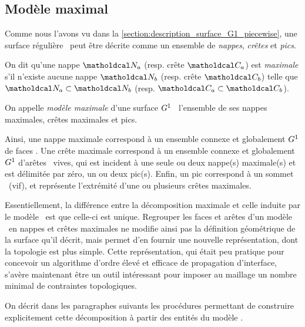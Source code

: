 \subsection{Modèle maximal}
Comme nous l'avons vu dans la \autoref{section:description_surface_G1_piecewise}, une surface régulière \piecewise\ peut être décrite comme un ensemble de \textit{nappes}, \textit{crêtes} et \textit{pics}. \par 

\begin{definition}
	On dit qu'une nappe $\nappe_a$ (resp. crête $\crete_a$) est \emph{maximale} s'il n'existe aucune nappe $\nappe_b$ (resp. crête $\crete_b$) telle que $\nappe_a \subset \nappe_b$ (resp. $\crete_a \subset \crete_b$). \par
	On appelle \emph{modèle maximale} d'une surface $G^{1}$ \piecewise\ l'ensemble de ses nappes maximales, crêtes maximales et pics.
\end{definition}

Ainsi, une nappe maximale correspond à un ensemble connexe et globalement $G^{1}$ de faces \brep. 
Une crête maximale correspond à un ensemble connexe et globalement $G^{1}$ d'arêtes \brep\ vives, qui est incident à une seule ou deux nappe(s) maximale(s) et est délimitée par zéro, un ou deux pic(s).
Enfin, un pic correspond à un sommet \brep\ (vif), et représente l'extrémité d'une ou plusieurs crêtes maximales.\par
Essentiellement, la différence entre la décomposition maximale et celle induite par le modèle \brep\ est que celle-ci est unique. 
Regrouper les faces et arêtes d'un modèle \brep\ en nappes et crêtes maximales ne modifie ainsi pas la définition géométrique de la surface qu'il décrit, mais permet d'en fournir une nouvelle représentation, dont la topologie est plus simple. 
Cette représentation, qui était peu pratique pour concevoir un algorithme d'ordre élevé et efficace de propagation d'interface, s'avère maintenant être un outil intéressant pour imposer au maillage un nombre minimal de contraintes topologiques.\par
On décrit dans les paragraphes suivants les procédures permettant de construire explicitement cette décomposition à partir des entités du modèle \brep.

